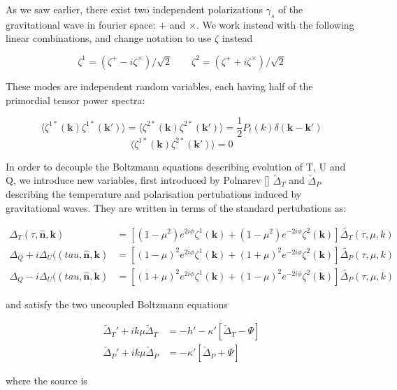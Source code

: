 \documentclass[a4paper,11pt]{article}
\renewcommand{\v}[1]{\mathbf{#1}}
\newcommand{\half}{\frac{1}{2}}
\newcommand{\unit}[1]{\hat{\v{#1}}}
\begin{document}
As we saw earlier, there exist two independent polarizations $\gamma_s$ of the gravitational wave in fourier space: $+$ and $\times$. We work instead with the following linear combinations, and change notation to use $\zeta$ instead

\begin{equation}
\zeta^1 = (\zeta^+ - i\zeta^\times)/\sqrt{2} \qquad \zeta^2 = (\zeta^+ + i\zeta^\times)/\sqrt{2}
\end{equation}

These modes are independent random variables, each having half of the primordial tensor power spectra:

\begin{equation}
\langle \zeta^{1*}(\v{k})\zeta^{1*}(\v{k'})\rangle=\langle \zeta^{2*}(\v{k})\zeta^{2*}(\v{k'})\rangle=\half P_t(k)\delta(\v{k}-\v{k'})
\end{equation}
\begin{equation}
\langle \zeta^{1*}(\v{k})\zeta^{2*}(\v{k'})\rangle=0
\end{equation}

In order to decouple the Boltzmann equations describing evolution of T, U and Q, we introduce new variables, first introduced by Polnarev [] $\tilde{\Delta}_T$ and $\tilde{\Delta}_P$ describing the temperature and polarisation pertubations induced by gravitational waves. They are written in terms of the standard pertubations as:

\begin{align}
\Delta_T(\tau,\unit{n},\v{k}) &= [(1-\mu^2) e^{2i\phi} \zeta^1(\v{k})+(1-\mu^2) e^{-2i\phi} \zeta^2(\v{k})]\tilde{\Delta_T}(\tau,\mu,k)\\
\Delta_Q+i\Delta_U((tau,\unit{n},\v{k}) &=[(1-\mu)^2 e^{2i\phi} \zeta^1(\v{k})+(1+\mu)^2 e^{-2i\phi} \zeta^2(\v{k})]\tilde{\Delta_P}(\tau,\mu,k) \\
\Delta_Q-i\Delta_U((tau,\unit{n},\v{k}) &=[(1+\mu)^2 e^{2i\phi} \zeta^1(\v{k})+(1-\mu)^2 e^{-2i\phi} \zeta^2(\v{k})]\tilde{\Delta_P}(\tau,\mu,k)
\end{align}

and satisfy the two uncoupled Boltzmann equations

\begin{align}
\tilde{\Delta}_T'+ik\mu \tilde{\Delta}_T &= -h' -\kappa'[\tilde{\Delta}_T - \Psi]\\
\tilde{\Delta}_P'+ik\mu\tilde{\Delta}_P &= -\kappa'[\tilde{\Delta}_P + \Psi]
\end{align}

where the source is
\end{document}
